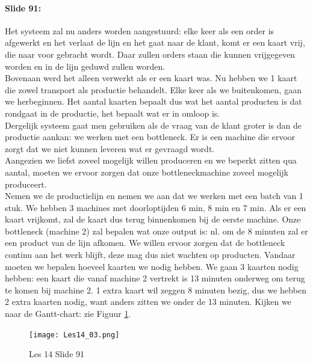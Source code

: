 \documentclass[10pt,a4paper]{report}
\begin{document}
\paragraph{Slide 91:} Het systeem zal nu anders worden aangestuurd: elke keer als een order is afgewerkt en het verlaat de lijn en het gaat naar de klant, komt er een kaart vrij, die naar voor gebracht wordt. Daar zullen orders staan die kunnen vrijgegeven worden en in de lijn geduwd zullen worden.\\
Bovenaan werd het alleen verwerkt als er een kaart was. Nu hebben we 1 kaart die zowel transport als productie behandelt. Elke keer als we buitenkomen, gaan we herbeginnen. Het aantal kaarten bepaalt dus wat het aantal producten is dat rondgaat in de productie, het bepaalt wat er in omloop is.\\
Dergelijk systeem gaat men gebruiken als de vraag van de klant groter is dan de productie aankan: we werken met een bottleneck. Er is een machine die ervoor zorgt dat we niet kunnen leveren wat er gevraagd wordt.\\
Aangezien we liefst zoveel mogelijk willen produceren en we beperkt zitten qua aantal, moeten we ervoor zorgen dat onze bottleneckmachine zoveel mogelijk produceert. \\
Nemen we de productielijn en nemen we aan dat we werken met een batch van 1 stuk. We hebben 3 machines met doorloptijden 6 min, 8 min en 7 min. Als er een kaart vrijkomt, zal de kaart dus terug binnenkomen bij de eerste machine. Onze bottleneck (machine 2) zal bepalen wat onze output is: nl. om de 8 minuten zal er een product van de lijn afkomen. We willen ervoor zorgen dat de bottleneck continu aan het werk blijft, deze mag dus niet wachten op producten. Vandaar moeten we bepalen hoeveel kaarten we nodig hebben. We gaan 3 kaarten nodig hebben: een kaart die vanaf machine 2 vertrekt is 13 minuten onderweg om terug te komen bij machine 2. 1 extra kaart wil zeggen 8 minuten bezig, dus we hebben 2 extra kaarten nodig, want anders zitten we onder de 13 minuten. Kijken we naar de Gantt-chart: zie Figuur \ref{les14_03}.\\

\begin{figure}[h!]
\centering
\texttt{[image: Les14\_03.png]}
\caption{Les 14 Slide 91} 
\label{les14_03}
\end{figure}
\end{document}
